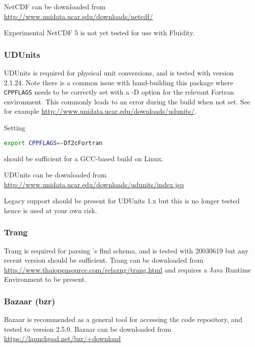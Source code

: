 NetCDF can be downloaded from \url{http://www.unidata.ucar.edu/downloads/netcdf/}

Experimental NetCDF 5 is not yet tested for use with Fluidity.

\subsubsection{UDUnits}
\label{sec:required_libraries_supporting_udunits}

UDUnits is required for physical unit conversions, and is tested with version
2.1.24. Note there is a common issue with hand-building this package where
\lstinline[language=bash]+CPPFLAGS+ needs to be correctly set with a -D
option for the relevant Fortran environment. This commonly leads to an error
during the build when not set. See for example
\url{http://www.unidata.ucar.edu/downloads/udunits/}.

Setting

\begin{lstlisting}[language=bash]
export CPPFLAGS=-Df2cFortran
\end{lstlisting}

should be sufficient for a GCC-based build on Linux.

UDUnits can be downloaded from \url{http://www.unidata.ucar.edu/downloads/udunits/index.jsp}

Legacy support should be present for UDUnits 1.x but this is no longer tested 
hence is used at your own risk.

\subsubsection{Trang}
\label{sec:required_libraries_supporting_trang}

Trang is required for parsing \fluidity's flml schema, and is tested with
20030619 but any recent version should be sufficient. Trang can be downloaded
from \url{http://www.thaiopensource.com/relaxng/trang.html} and requires a
Java Runtime Environment to be present.

\subsubsection{Bazaar (bzr)}
\label{sec:required_libraries_supporting_bzr}

Bazaar is recommended as a general tool for accessing the \fluidity code
repository, and tested to version 2.5.0. Bazaar can be
downloaded from \url{https://launchpad.net/bzr/+download}
